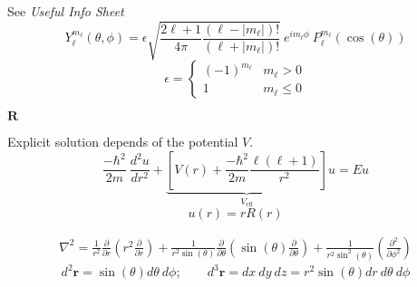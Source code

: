 
See \textit{Useful Info Sheet}
\begin{equation*}
    Y_{\ell}^{m_\ell}(\theta, \phi) = \epsilon\sqrt{\frac{2\ell+1}{4\pi}\frac{(\ell-|m_\ell|)!}{(\ell+|m_\ell|)!}}\:e^{im_\ell\phi}\:P_{\ell}^{m_\ell}(\cos(\theta))
\end{equation*}
\begin{equation*}
    \epsilon = \begin{cases}
        {(-1)}^{m_\ell} & m_\ell > 0    \\
        1               & m_\ell \leq 0
    \end{cases}
\end{equation*}

\newpar{}
 $\mathbf{R}$

Explicit solution depends of the potential $V$.
\begin{equation*}
    \frac{-\hbar^2}{2m}\:\frac{d^2u}{dr^2}+\underbrace{\left[V(r)+\frac{-\hbar^2}{2m}\frac{\ell(\ell+1)}{r^2}\right]}_{V_{\text{eff}}}u = Eu
\end{equation*}
\begin{equation*}
    u(r) = rR(r)
\end{equation*}

{\footnotesize
    \begin{align*}
        \nabla^2  =\frac{1}{r^2}\frac{\partial}{\partial r}\left(r^2\frac{\partial}{\partial r}\right) + \frac{1}{r^2\sin(\theta)}\frac{\partial}{\partial\theta}\left(\sin(\theta)\frac{\partial}{\partial \theta}\right)
        + \frac{1}{r^2\sin^2(\theta)}\left(\frac{\partial^2}{\partial \phi^2}\right)
    \end{align*}}
\begin{equation*}
    d^2\mathbf{r} = \sin(\theta)d\theta\:d\phi; \qquad
    d^3\mathbf{r} = dx\:dy\:dz = r^2\sin(\theta)dr\:d\theta\:d\phi
\end{equation*}

